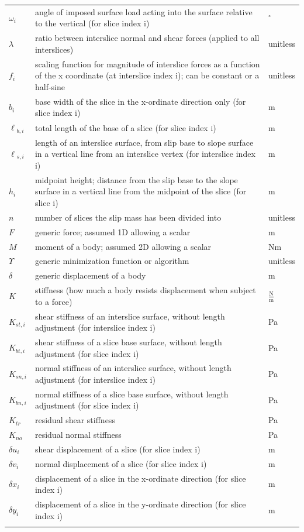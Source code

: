 \documentclass[12pt]{article}
\begin{document}
\begin{longtable*}{l l l}
\\
$\omega{}_{i}$ & angle of imposed surface load acting into the surface relative to the vertical (for slice index i) & ${}^{\circ}$
\\
$\lambda{}$ & ratio between interslice normal and shear forces (applied to all interslices) & unitless
\\
$f_{i}$ & scaling function for magnitude of interslice forces as a function of the x coordinate (at interslice index i); can be constant or a half-sine & unitless
\\
$b_{i}$ & base width of the slice in the x-ordinate direction only (for slice index i) & m
\\
$\ell{}_{b,i}$ & total length of the base of a slice (for slice index i) & m
\\
$\ell{}_{s,i}$ & length of an interslice surface, from slip base to slope surface in a vertical line from an interslice vertex (for interslice index i) & m
\\
$h_{i}$ & midpoint height; distance from the slip base to the slope surface in a vertical line from the midpoint of the slice (for slice i) & m
\\
$n$ & number of slices the slip mass has been divided into & unitless
\\
$F$ & generic force; assumed 1D allowing a scalar & m
\\
$M$ & moment of a body; assumed 2D allowing a scalar & Nm
\\
$\Upsilon{}$ & generic minimization function or algorithm & unitless
\\
$\delta{}$ & generic displacement of a body & m
\\
$K$ & stiffness (how much a body resists displacement when subject to a force) & $\frac{\text{N}}{\text{m}}$
\\
$K_{st,i}$ & shear stiffness of an interslice surface, without length adjustment (for interslice index i) & Pa
\\
$K_{bt,i}$ & shear stiffness of a slice base surface, without length adjustment (for slice index i) & Pa
\\
$K_{sn,i}$ & normal stiffness of an interslice surface, without length adjustment (for interslice index i) & Pa
\\
$K_{bn,i}$ & normal stiffness of a slice base surface, without length adjustment (for slice index i) & Pa
\\
$K_{tr}$ & residual shear stiffness & Pa
\\
$K_{no}$ & residual normal stiffness & Pa
\\
$\delta{}u_{i}$ & shear displacement of a slice (for slice index i) & m
\\
$\delta{}v_{i}$ & normal displacement of a slice (for slice index i) & m
\\
$\delta{}x_{i}$ & displacement of a slice in the x-ordinate direction (for slice index i) & m
\\
$\delta{}y_{i}$ & displacement of a slice in the y-ordinate direction (for slice index i) & m
\\
\bottomrule
\label{Table:ToS}
\end{longtable*}
\end{document}
